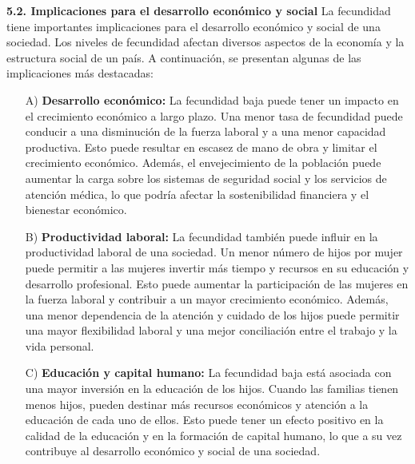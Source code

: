 \documentclass[8pt,a4paper]{beamer}
\begin{document}
{\begin{frame}{}
\begin{block}{\textbf{5.2. Implicaciones para el desarrollo económico y social}}
\setlength{\parskip}{3px}
\justifying
La fecundidad tiene importantes implicaciones para el desarrollo económico y social de una sociedad. Los niveles de fecundidad afectan diversos aspectos de la economía y la estructura social de un país. A continuación, se presentan algunas de las implicaciones más destacadas:
\begin{enumerate}
\setlength{\parskip}{3px}
\justifying
\item[A)] \textbf{Desarrollo económico:} La fecundidad baja puede tener un impacto en el crecimiento económico a largo plazo. Una menor tasa de fecundidad puede conducir a una disminución de la fuerza laboral y a una menor capacidad productiva. Esto puede resultar en escasez de mano de obra y limitar el crecimiento económico. Además, el envejecimiento de la población puede aumentar la carga sobre los sistemas de seguridad social y los servicios de atención médica, lo que podría afectar la sostenibilidad financiera y el bienestar económico.

\item[B)] \textbf{Productividad laboral:} La fecundidad también puede influir en la productividad laboral de una sociedad. Un menor número de hijos por mujer puede permitir a las mujeres invertir más tiempo y recursos en su educación y desarrollo profesional. Esto puede aumentar la participación de las mujeres en la fuerza laboral y contribuir a un mayor crecimiento económico. Además, una menor dependencia de la atención y cuidado de los hijos puede permitir una mayor flexibilidad laboral y una mejor conciliación entre el trabajo y la vida personal.
\end{enumerate}
\end{block}
\end{frame}


\begin{frame}{}
\begin{block}{}
\setlength{\parskip}{3px}
\justifying
\begin{enumerate}
\setlength{\parskip}{3px}
\justifying
\item[C)] \textbf{Educación y capital humano:} La fecundidad baja está asociada con una mayor inversión en la educación de los hijos. Cuando las familias tienen menos hijos, pueden destinar más recursos económicos y atención a la educación de cada uno de ellos. Esto puede tener un efecto positivo en la calidad de la educación y en la formación de capital humano, lo que a su vez contribuye al desarrollo económico y social de una sociedad.


\end{enumerate}
\end{block}
\end{frame}}
\end{document}
